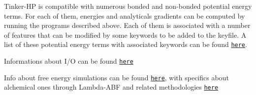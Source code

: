 \begin{DoxyItemize}
\item Tinker-\/\-H\-P is compatible with numerous bonded and non-\/bonded potential energy terms. For each of them, energies and analyticals gradients can be computed by running the programs described above. Each of them is associated with a number of features that can be modified by some keywords to be added to the keyfile. A list of these potential energy terms with associated keywords can be found \href{md_potential_doxygen.html}{\tt here}.
\item Informations about I/\-O can be found \href{md_io_doxygen.html}{\tt here}
\item Info about free energy simulations can be found \href{md_free_energy.html}{\tt here}, with specifics about alchemical ones through Lambda-\/\-A\-B\-F and related methodologies \href{md_lambda-abf_doxygen.html}{\tt here} 
\end{DoxyItemize}